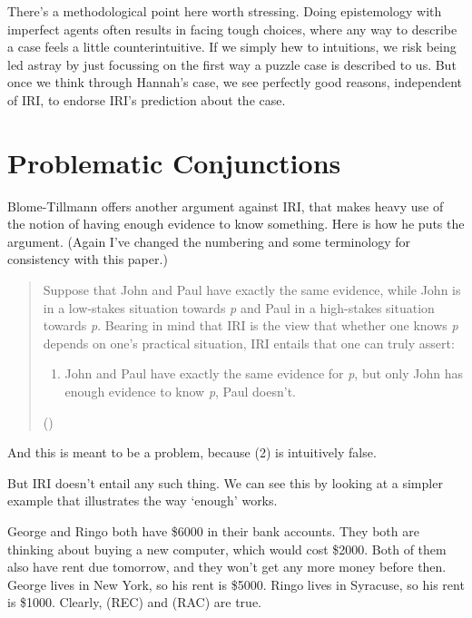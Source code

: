 \documentclass[
  10pt,
  letterpaper,
  DIV=11,
  numbers=noendperiod,
  twoside]{scrartcl}
\providecommand{\tightlist}{%
  \setlength{\itemsep}{0pt}\setlength{\parskip}{0pt}}\usepackage{longtable,booktabs,array}
\begin{document}
There's a methodological point here worth stressing. Doing epistemology
with imperfect agents often results in facing tough choices, where any
way to describe a case feels a little counterintuitive. If we simply hew
to intuitions, we risk being led astray by just focussing on the first
way a puzzle case is described to us. But once we think through Hannah's
case, we see perfectly good reasons, independent of IRI, to endorse
IRI's prediction about the case.

\section{Problematic Conjunctions}\label{sect:conj}

Blome-Tillmann offers another argument against IRI, that makes heavy use
of the notion of having enough evidence to know something. Here is how
he puts the argument. (Again I've changed the numbering and some
terminology for consistency with this paper.)

\begin{quote}
Suppose that John and Paul have exactly the same evidence, while John is
in a low-stakes situation towards \emph{p} and Paul in a high-stakes
situation towards \emph{p}. Bearing in mind that IRI is the view that
whether one knows \emph{p} depends on one's practical situation, IRI
entails that one can truly assert:

\begin{enumerate}
\def\labelenumi{\arabic{enumi}.}
\setcounter{enumi}{1}
\tightlist
\item
  John and Paul have exactly the same evidence for \emph{p}, but only
  John has enough evidence to know \emph{p}, Paul doesn't.
\end{enumerate}

()
\end{quote}

And this is meant to be a problem, because (2) is intuitively false.

But IRI doesn't entail any such thing. We can see this by looking at a
simpler example that illustrates the way `enough' works.

George and Ringo both have \$6000 in their bank accounts. They both are
thinking about buying a new computer, which would cost \$2000. Both of
them also have rent due tomorrow, and they won't get any more money
before then. George lives in New York, so his rent is \$5000. Ringo
lives in Syracuse, so his rent is \$1000. Clearly, (REC) and (RAC) are
true.
\end{document}
